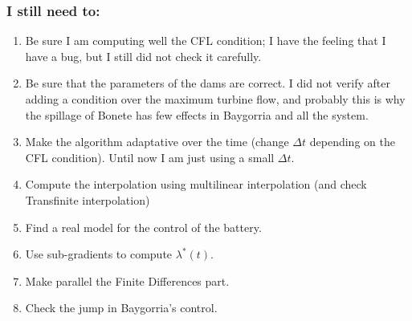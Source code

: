 \documentclass[aspectratio=169]{beamer}\usepackage[utf8]{inputenc}
\begin{document}
\begin{frame}\frametitle{I still need to:}
\begin{enumerate}
\item Be sure I am computing well the CFL condition; I have the feeling that I have a bug, but I still did not check it carefully.
\item Be sure that the parameters of the dams are correct. I did not verify after adding a
condition over the maximum turbine flow, and probably this is why the spillage of
Bonete has few effects in Baygorria and all the system.
\item Make the algorithm adaptative over the time (change $\Delta t$ depending on the CFL condition). Until now I am just using a small $\Delta t$.
\item Compute the interpolation using multilinear interpolation (and check Transfinite interpolation)
\item Find a real model for the control of the battery.
\item Use sub-gradients to compute $\lambda^*(t)$.
\item Make parallel the Finite Differences part.
\item Check the jump in Baygorria's control.
\end{enumerate}
\end{frame}
\end{document}

